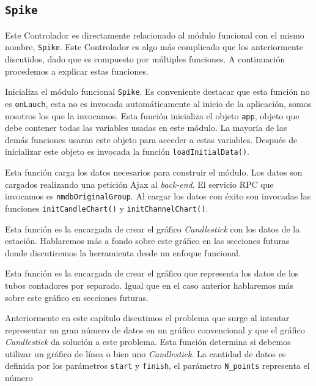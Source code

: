 	\subsection{\texttt{Spike}}
		Este Controlador es directamente relacionado al módulo funcional con el mismo nombre, \texttt{Spike}. Este Controlador es algo más
		complicado que los anteriormente discutidos, dado que es compuesto por múltiples funciones. A continuación procedemos a explicar estas
		funciones.
		\begin{description}[style=unboxed,leftmargin=0cm]
			\item[\texttt{Launch()}] Inicializa el módulo funcional \texttt{Spike}. Es conveniente destacar que esta función no es
			  \texttt{onLauch}, esta no es invocada automáticamente al inicio de la aplicación, somos nosotros los que la invocamos. Esta
			  función inicializa el objeto \texttt{app}, objeto que debe contener todas las variables usadas en este módulo. La mayoría de
			  las demás funciones usaran este objeto para acceder a estas variables. Después de inicializar este objeto es invocada la
			  función \texttt{loadInitialData()}.
			\item[\texttt{loadInitialData()}] Esta función carga los datos necesarios para construir el módulo. Los datos son cargados
			  realizando una petición Ajax al \emph{back-end}. El servicio RPC que invocamos es \texttt{nmdbOriginalGroup}. Al cargar los
			  datos con éxito son invocadas las funciones \texttt{initCandleChart()} y \texttt{initChannelChart()}. 
			\item[\texttt{initCandleChart()}] Esta función es la encargada de crear el gráfico \emph{Candlestick} con los datos de la
			  estación. Hablaremos más a fondo sobre este gráfico en las secciones futuras donde discutiremos la herramienta desde un
			  enfoque funcional.
			\item[\texttt{initChannelChart()}] Esta función es la encargada de crear el gráfico que representa los datos de los tubos
			  contadores por separado. Igual que en el caso anterior hablaremos más sobre este gráfico en secciones futuras.
			\item[\texttt{LineOrOhcl(start, finish, N\_points)}] Anteriormente en este capítulo discutimos el problema que surge al
			  intentar representar un gran número de datos en un gráfico convencional y que el gráfico \emph{Candlestick} da solución a
			  este problema. Esta función determina si debemos utilizar un gráfico de línea o bien uno \emph{Candlestick}. La cantidad de
			  datos es definida por los parámetros \texttt{start} y \texttt{finish}, el parámetro \texttt{N\_points} representa el número

\end{description}
